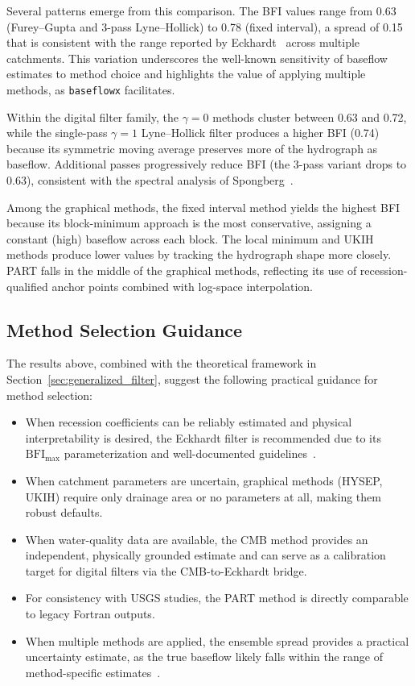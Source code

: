\documentclass[hydrology,article,submit,pdftex,moreauthors]{Definitions/mdpi}
\begin{document}
Several patterns emerge from this comparison. The BFI values range from 0.63 (Furey--Gupta and 3-pass Lyne--Hollick) to 0.78 (fixed interval), a spread of 0.15 that is consistent with the range reported by Eckhardt~\cite{Eckhardt2008} across multiple catchments. This variation underscores the well-known sensitivity of baseflow estimates to method choice and highlights the value of applying multiple methods, as \texttt{baseflowx} facilitates.

Within the digital filter family, the $\gamma = 0$ methods cluster between 0.63 and 0.72, while the single-pass $\gamma = 1$ Lyne--Hollick filter produces a higher BFI (0.74) because its symmetric moving average preserves more of the hydrograph as baseflow. Additional passes progressively reduce BFI (the 3-pass variant drops to 0.63), consistent with the spectral analysis of Spongberg~\cite{Spongberg2000}.

Among the graphical methods, the fixed interval method yields the highest BFI because its block-minimum approach is the most conservative, assigning a constant (high) baseflow across each block. The local minimum and UKIH methods produce lower values by tracking the hydrograph shape more closely. PART falls in the middle of the graphical methods, reflecting its use of recession-qualified anchor points combined with log-space interpolation.

\subsection{Method Selection Guidance}
\label{sec:method_guidance}

The results above, combined with the theoretical framework in Section~\ref{sec:generalized_filter}, suggest the following practical guidance for method selection:

\begin{itemize}[nosep]
\item When recession coefficients can be reliably estimated and physical interpretability is desired, the Eckhardt filter is recommended due to its $\mathrm{BFI_{max}}$ parameterization and well-documented guidelines~\cite{Eckhardt2005,Collischonn2013}.
\item When catchment parameters are uncertain, graphical methods (HYSEP, UKIH) require only drainage area or no parameters at all, making them robust defaults.
\item When water-quality data are available, the CMB method provides an independent, physically grounded estimate and can serve as a calibration target for digital filters via the CMB-to-Eckhardt bridge.
\item For consistency with USGS studies, the PART method is directly comparable to legacy Fortran outputs.
\item When multiple methods are applied, the ensemble spread provides a practical uncertainty estimate, as the true baseflow likely falls within the range of method-specific estimates~\cite{Eckhardt2008}.
\end{itemize}
\end{document}
